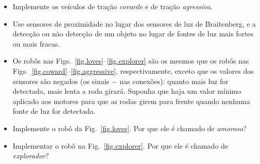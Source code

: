 \begin{framed}
\begin{itemize}
\item Implemente os veículos de tração \emph{covarde} e de tração \emph{agressiva}.
\item Use sensores de proximidade no lugar dos sensores de luz de Braitenberg, e a detecção ou não detecção de um objeto no lugar de fontes de luz mais fortes ou mais fracas.
\item Os robôs nas Figs.~\ref{fig.loves}--\ref{fig.explorer} são os mesmos que os robôs nas Figs.~\ref{fig.coward}--\ref{fig.aggressive}, respectivamente, exceto que os valores dos sensores são negados (os sinais $-$ nas conexões): quanto mais luz for detectada, mais lenta a roda girará. Suponha que haja um valor mínimo aplicado aos motores para que as rodas girem para frente quando nenhuma fonte de luz for detectada.
\item Implemente o robô da Fig.~\ref{fig.loves}. Por que ele é chamado de \emph{amoroso}?
\item Implementar o robô na Fig.~\ref{fig.explorer}. Por que ele é chamado de \emph{explorador}?
\end{itemize}
\end{framed}

